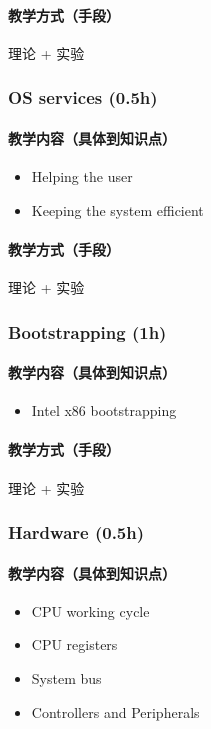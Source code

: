 \documentclass[11pt]{article}
\begin{document}
\paragraph{教学方式（手段）}
\label{sec-1-2-1-2}
理论 + 实验
\subsubsection{OS services (0.5h)}
\label{sec-1-2-2}
\paragraph{教学内容（具体到知识点）}
\label{sec-1-2-2-1}
\begin{itemize}
\item Helping the user
\item Keeping the system efficient
\end{itemize}
\paragraph{教学方式（手段）}
\label{sec-1-2-2-2}
理论 + 实验
\subsubsection{Bootstrapping (1h)}
\label{sec-1-2-3}
\paragraph{教学内容（具体到知识点）}
\label{sec-1-2-3-1}
\begin{itemize}
\item Intel x86 bootstrapping
\end{itemize}
\paragraph{教学方式（手段）}
\label{sec-1-2-3-2}
理论 + 实验
\subsubsection{Hardware (0.5h)}
\label{sec-1-2-4}
\paragraph{教学内容（具体到知识点）}
\label{sec-1-2-4-1}
\begin{itemize}
\item CPU working cycle
\item CPU registers
\item System bus
\item Controllers and Peripherals
\end{itemize}
\end{document}

